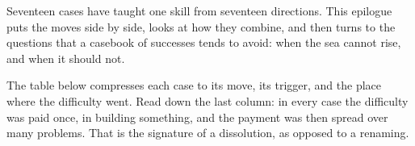 \begin{refsection}

Seventeen cases have taught one skill from seventeen directions. This epilogue puts the moves side by side, looks at how they combine, and then turns to the questions that a casebook of successes tends to avoid: when the sea cannot rise, and when it should not.


The table below compresses each case to its move, its trigger, and the place where the difficulty went. Read down the last column: in every case the difficulty was paid once, in building something, and the payment was then spread over many problems. That is the signature of a dissolution, as opposed to a renaming.


\end{refsection}
